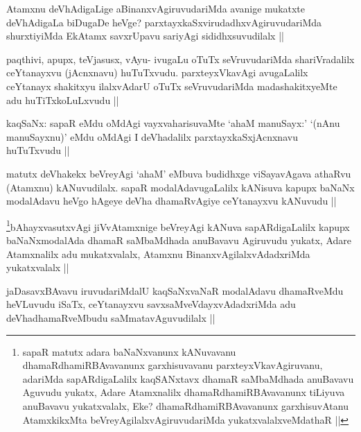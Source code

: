 \begin{artha}
Atamxnu deVhAdigaLige aBinanxvAgiruvudariMda avanige mukatxte deVhAdigaLa biDugaDe heVge? parxtayxkaSxvirudadhxvAgiruvudariMda shurxtiyiMda EkAtamx savxrUpavu sariyAgi sididhxsuvudilalx ||
\end{artha}

\begin{artha}
paqthivi, apupx, teVjasusx, vAyu- ivugaLu oTuTx seVruvudariMda shariVradalilx ceYtanayxvu (jAcnxnavu) huTuTxvudu. parxteyxVkavAgi avugaLalilx ceYtanayx shakitxyu ilalxvAdarU oTuTx seVruvudariMda madashakitxyeMte adu huTiTxkoLuLxvudu ||
\end{artha}

\begin{artha}
kaqSaNx: sapaR eMdu oMdAgi vayxvaharisuvaMte `ahaM manuSayx:' `(nAnu manuSayxnu)' eMdu oMdAgi I deVhadalilx parxtayxkaSxjAcnxnavu huTuTxvudu ||
\end{artha}

\begin{artha}
matutx deVhakekx beVreyAgi `ahaM' eMbuva budidhxge viSayavAgava athaRvu (Atamxnu) kANuvudilalx. sapaR modalAdavugaLalilx kANisuva kapupx baNaNx modalAdavu heVgo hAgeye deVha dhamaRvAgiye ceYtanayxvu kANuvudu ||
\end{artha}

\begin{artha}
\footnote{sapaR matutx adara baNaNxvanunx kANuvavanu dhamaRdhamiRBAvavanunx garxhisuvavanu parxteyxVkavAgiruvanu, adariMda sapARdigaLalilx kaqSANxtavx dhamaR saMbaMdhada anuBavavu Aguvudu yukatx, Adare Atamxnalilx dhamaRdhamiRBAvavanunx tiLiyuva anuBavavu yukatxvalalx, Eke? dhamaRdhamiRBAvavanunx garxhisuvAtanu AtamxkikxMta beVreyAgilalxvAgiruvudariMda yukatxvalalxveMdathaR ||}bAhayxvasutxvAgi jiVvAtamxnige beVreyAgi kANuva sapARdigaLalilx kapupx baNaNxmodalAda dhamaR saMbaMdhada anuBavavu Agiruvudu yukatx, Adare Atamxnalilx adu mukatxvalalx, Atamxnu BinanxvAgilalxvAdadxriMda yukatxvalalx ||
\end{artha}

\begin{artha}
jaDasavxBAvavu iruvudariMdalU kaqSaNxvaNaR modalAdavu dhamaRveMdu heVLuvudu iSaTx, ceYtanayxvu savxsaMveVdayxvAdadxriMda adu deVhadhamaRveMbudu saMmatavAguvudilalx ||
\end{artha}

